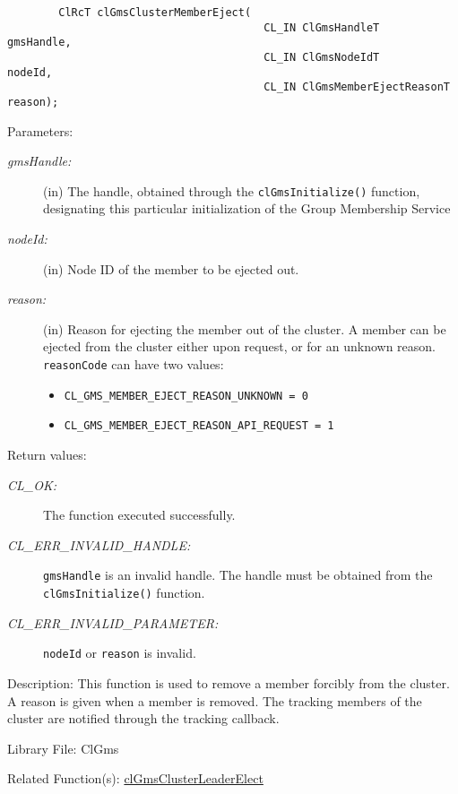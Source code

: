 \begin{flushleft}
\begin{Desc}
\footnotesize\begin{verbatim}        ClRcT clGmsClusterMemberEject(
                                		CL_IN ClGmsHandleT                      gmsHandle,
                                		CL_IN ClGmsNodeIdT                      nodeId,
                                		CL_IN ClGmsMemberEjectReasonT           reason);
\end{verbatim}
\normalsize
\end{Desc}
\begin{Desc}
\item[Parameters:]
\begin{description}
\item[{\em gms\-Handle:}](in) The handle, obtained through the {\tt{clGmsInitialize()}} function, designating this particular initialization of the
Group Membership Service \item[{\em node\-Id:}](in) Node ID of the member to be ejected out. \item[{\em reason:}](in) Reason for ejecting the member out 
of the cluster. A member can be ejected from the cluster either upon request, or for an unknown reason. {\tt{reason\-Code}} can have two values:
\begin{itemize}
\item 
{\tt{CL\_\-GMS\_\-MEMBER\_\-EJECT\_\-REASON\_\-UNKNOWN = 0}}
\item 
{\tt{CL\_\-GMS\_\-MEMBER\_\-EJECT\_\-REASON\_\-API\_\-REQUEST = 1}}
\end{itemize}
\end{description}
\end{Desc}
\begin{Desc}
\item[Return values:]
\begin{description}
\item[{\em CL\_\-OK:}]The function executed successfully.
\item[{\em CL\_\-ERR\_\-INVALID\_\-HANDLE:}]{\tt{gmsHandle}} is an invalid handle. The handle must be obtained from the
{\tt{clGmsInitialize()}} function.
\item[{\em CL\_\-ERR\_\-INVALID\_\-PARAMETER:}]{\tt{nodeId}} or {\tt{reason}} is invalid.\end{description}
\end{Desc}
\begin{Desc}
\item[Description:]This function is used to remove a member forcibly from the cluster. A reason is given when a member is removed.
The tracking members of the cluster are notified
through the tracking callback.\end{Desc}
\begin{Desc}
\item[Library File:]Cl\-Gms\end{Desc}
\begin{Desc}
\item[Related Function(s):]\hyperlink{pagegms205}{cl\-Gms\-Cluster\-Leader\-Elect} \end{Desc}
\newpage


\end{flushleft}
